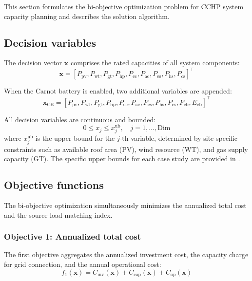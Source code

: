 This section formulates the bi-objective optimization problem for CCHP system capacity planning and describes the solution algorithm.

\subsection{Decision variables}
\label{sec:decision_vars}

The decision vector $\mathbf{x}$ comprises the rated capacities of all system components:
\begin{equation}
    \mathbf{x} = [P_{\text{pv}}, P_{\text{wt}}, P_{\text{gt}}, P_{\text{hp}}, P_{\text{ec}}, P_{\text{ac}}, P_{\text{es}}, P_{\text{hs}}, P_{\text{cs}}]^{\top}
    \label{eq:decision_base}
\end{equation}

When the Carnot battery is enabled, two additional variables are appended:
\begin{equation}
    \mathbf{x}_{\text{CB}} = [P_{\text{pv}}, P_{\text{wt}}, P_{\text{gt}}, P_{\text{hp}}, P_{\text{ec}}, P_{\text{ac}}, P_{\text{es}}, P_{\text{hs}}, P_{\text{cs}}, P_{\text{cb}}, E_{\text{cb}}]^{\top}
    \label{eq:decision_cb}
\end{equation}

All decision variables are continuous and bounded:
\begin{equation}
    0 \leq x_j \leq x_j^{\text{ub}}, \quad j = 1, \ldots, \text{Dim}
    \label{eq:bounds}
\end{equation}
where $x_j^{\text{ub}}$ is the upper bound for the $j$-th variable, determined by site-specific constraints such as available roof area (PV), wind resource (WT), and gas supply capacity (GT). The specific upper bounds for each case study are provided in .

\subsection{Objective functions}
\label{sec:objectives}

The bi-objective optimization simultaneously minimizes the annualized total cost and the source-load matching index.

\subsubsection{Objective 1: Annualized total cost}

The first objective aggregates the annualized investment cost, the capacity charge for grid connection, and the annual operational cost:
\begin{equation}
    f_1(\mathbf{x}) = C_{\text{inv}}(\mathbf{x}) + C_{\text{cap}}(\mathbf{x}) + C_{\text{op}}(\mathbf{x})
    \label{eq:obj1}
\end{equation}


